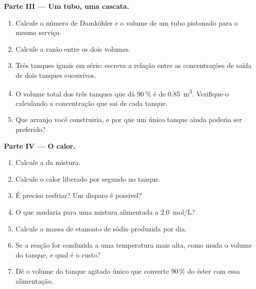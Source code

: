 \begin{problem}
\medskip
\noindent\textbf{Parte III --- Um tubo, uma cascata.}
\begin{enumerate}[resume]
  \item Calcule o número de Damköhler e o volume de um tubo pistonado para o
        mesmo serviço.
  \item Calcule a razão entre os dois volumes.
  \item Três tanques iguais em série: escreva a relação entre as
        concentrações de saída de dois tanques sucessivos.
  \item O volume total dos três tanques que dá 90\,\% é de
        \qty{0.85}{m^3}. Verifique-o calculando a concentração que sai de cada
        tanque.
  \item Que arranjo você construiria, e por que um único tanque ainda poderia
        ser preferido?
\end{enumerate}

\medskip
\noindent\textbf{Parte IV --- O calor.}
\begin{enumerate}[resume]
  \item Calcule a  da mistura.
  \item Calcule o calor liberado por segundo no tanque.
  \item É preciso resfriar? Um disparo é possível?
  \item O que mudaria para uma mistura alimentada a \qty{2.0}{mol/L}?
  \item Calcule a massa de etanoato de sódio produzida por dia.
  \item Se a reação for conduzida a uma temperatura mais alta, como muda o
        volume do tanque, e qual é o custo?
  \item Dê o volume do tanque agitado único que converte 90\,\% do éster com
        essa alimentação.
\end{enumerate}
\end{problem}
